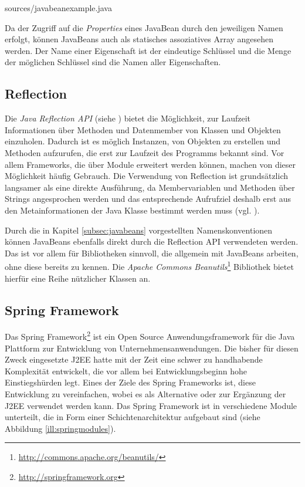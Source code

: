 \lstset{language=Java}

{sources/javabeanexample.java}

Da der Zugriff auf die \emph{Properties} eines JavaBean durch den jeweiligen
Namen erfolgt, können JavaBeans auch als statisches assoziatives Array angesehen
werden. Der Name einer Eigenschaft ist der eindeutige Schlüssel und die Menge der
möglichen Schlüssel sind die Namen aller Eigenschaften.

\subsection{Reflection}
Die \emph{Java Reflection API} (siehe \cite{sun:reflection}) bietet die
Möglichkeit, zur Laufzeit Informationen über Methoden und Datenmember von
Klassen und Objekten einzuholen. Dadurch ist es möglich Instanzen, von Objekten
zu erstellen und Methoden aufzurufen, die erst zur Laufzeit des Programms bekannt
sind. Vor allem Frameworks, die über Module erweitert werden können, machen von
dieser Möglichkeit häufig Gebrauch. Die Verwendung von Reflection ist
grundsätzlich langsamer als eine direkte Ausführung, da Membervariablen und
Methoden über Strings angesprochen werden und das entsprechende Aufrufziel
deshalb erst aus den Metainformationen der Java Klasse bestimmt werden muss
(vgl. \cite{wiki:reflection}).

Durch die in Kapitel \ref{subsec:javabeans} vorgestellten Namenskonventionen
können JavaBeans ebenfalls direkt durch die Reflection API verwendeten werden.
Das ist vor allem für Bibliotheken sinnvoll, die allgemein mit JavaBeans
arbeiten, ohne diese bereits zu kennen. Die \emph{Apache Commons
Beanutils}\footnote{\url{http://commons.apache.org/beanutils/}} Bibliothek bietet
hierfür eine Reihe nützlicher Klassen an.

\subsection{Spring Framework}\label{subsec:springframework}
Das Spring Framework\footnote{\url{http://springframework.org}} ist ein Open
Source Anwendungsframework für die Java Plattform zur Entwicklung von
Unternehmensanwendungen. Die bisher für diesen Zweck eingesetzte \ac{J2EE} hatte
mit der Zeit eine schwer zu handhabende Komplexität entwickelt, die vor allem bei
Entwicklungsbeginn hohe Einstiegshürden legt. Eines der Ziele des Spring
Frameworks ist, diese Entwicklung zu vereinfachen, wobei es als Alternative
oder zur Ergänzung der \ac{J2EE} verwendet werden kann. Das Spring Framework ist
in verschiedene Module unterteilt, die in Form einer Schichtenarchitektur
aufgebaut sind (siehe Abbildung \ref{ill:springmodules}).

